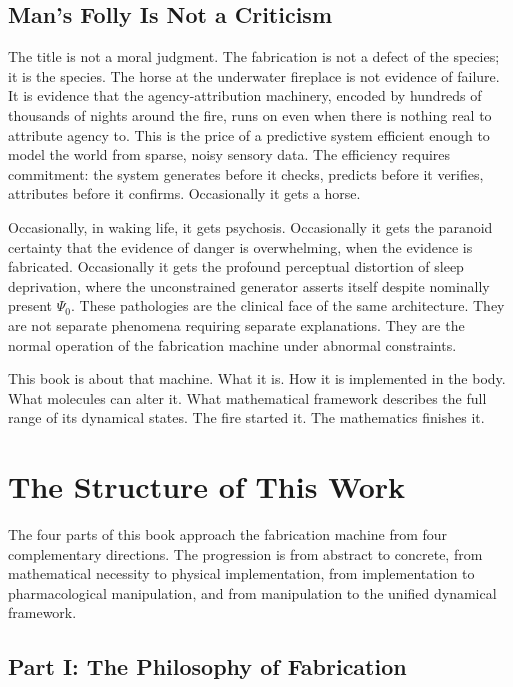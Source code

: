 \subsection{Man's Folly Is Not a Criticism}

The title is not a moral judgment. The fabrication is not a defect of the species; it is the species. The horse at the underwater fireplace is not evidence of failure. It is evidence that the agency-attribution machinery, encoded by hundreds of thousands of nights around the fire, runs on even when there is nothing real to attribute agency to. This is the price of a predictive system efficient enough to model the world from sparse, noisy sensory data. The efficiency requires commitment: the system generates before it checks, predicts before it verifies, attributes before it confirms. Occasionally it gets a horse.

Occasionally, in waking life, it gets psychosis. Occasionally it gets the paranoid certainty that the evidence of danger is overwhelming, when the evidence is fabricated. Occasionally it gets the profound perceptual distortion of sleep deprivation, where the unconstrained generator asserts itself despite nominally present $\Psi_0$. These pathologies are the clinical face of the same architecture. They are not separate phenomena requiring separate explanations. They are the normal operation of the fabrication machine under abnormal constraints.

This book is about that machine. What it is. How it is implemented in the body. What molecules can alter it. What mathematical framework describes the full range of its dynamical states. The fire started it. The mathematics finishes it.

\bigskip

\section{The Structure of This Work}

The four parts of this book approach the fabrication machine from four complementary directions. The progression is from abstract to concrete, from mathematical necessity to physical implementation, from implementation to pharmacological manipulation, and from manipulation to the unified dynamical framework.

\subsection{Part I: The Philosophy of Fabrication}

